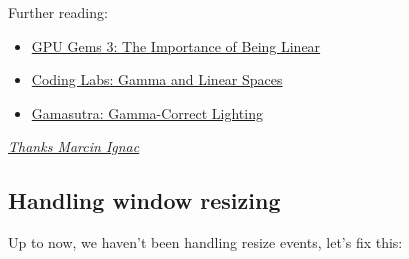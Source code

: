 \documentclass[11pt]{article}
\begin{document}
Further reading:

\begin{itemize}
\item \href{http://http.developer.nvidia.com/GPUGems3/gpugems3\_ch24.html}{GPU Gems 3: The Importance of Being Linear}
\item \href{http://www.codinglabs.net/article\_gamma\_vs\_linear.aspx}{Coding Labs: Gamma and Linear Spaces}
\item \href{http://www.gamasutra.com/blogs/DavidRosen/20100204/4322/GammaCorrect\_Lighting.php}{Gamasutra: Gamma-Correct Lighting}
\end{itemize}

\href{http://marcinignac.com/blog/pragmatic-pbr-setup-and-gamma/}{\emph{Thanks Marcin Ignac}}

\subsection*{Handling window resizing}
\label{sec:org8e6bc2e}

Up to now, we haven't been handling resize events, let's fix this:
\end{document}
